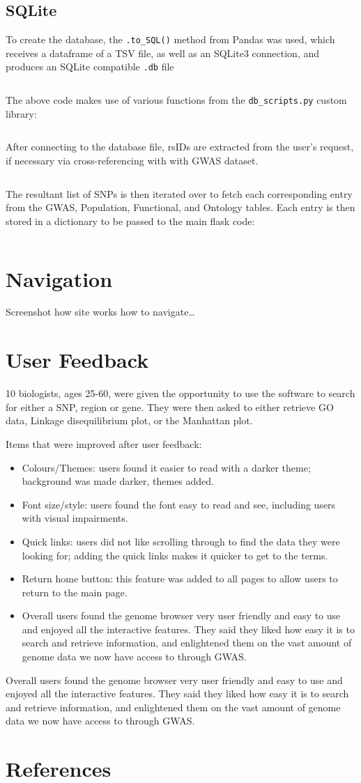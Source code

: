 \documentclass[12pt,a4paper]{article}
\newcommand{\mintfile}[1]{
\begin{tcolorbox}[colback=gray!5!white,%
	grow to left by=20mm,
    grow to right by=20mm,
    sharp corners]{{    \small \inputminted[breaklines]{python}{#1}		}}
\end{tcolorbox}}
\newcommand{\sect}[1]{
\clearpage
\hypertarget{#1}{
\section{#1}\label{#1}}
}
\newcommand{\subsect}[1]{
\FloatBarrier %
\hypertarget{#1}{
\subsection{#1}\label{#1}}
}
\begin{document}
\mintfile{code_snippets/flask/snp.py}

\subsect{SQLite}

To create the database, the \texttt{.to\_SQL()} method from Pandas was used, which receives a dataframe of a TSV file,
as well as an SQLite3 connection, and produces an SQLite compatible \texttt{.db} file

\mintfile{code_snippets/SQL/create_db.py}
The above code makes use of various functions from the \texttt{db\_scripts.py} custom library:

\mintfile{code_snippets/SQL/pdDB.py}

After connecting to the database file, rsIDs are extracted from the user's request,
if necessary via cross-referencing with with GWAS dataset.

\mintfile{code_snippets/SQL/DBreq1.py}

The resultant list of SNPs is then iterated over to fetch each corresponding entry from the
GWAS, Population, Functional, and Ontology tables.
Each entry is then stored in a dictionary to be passed to the main flask code:

\FloatBarrier

\mintfile{code_snippets/SQL/DBreq2.py}
\FloatBarrier

\sect{Navigation}
Screenshot how site works how to navigate\ldots








\sect{User Feedback}
10 biologists, ages 25-60, were given the opportunity to use the software to search for either a SNP, region or gene. They were then asked to either retrieve GO data, Linkage disequilibrium plot, or the Manhattan plot.

Items that were improved after user feedback:

\begin{itemize}
\item Colours/Themes: users found it easier to read with a darker theme; background was made darker, themes added.
\item Font size/style: users found the font easy to read and see, including users with visual impairments.
\item Quick links: users did not like scrolling through to find the data they were looking for; adding the quick links makes it quicker to get to the terms.
\item Return home button: this feature was added to all pages to allow users to return to the main page.
\item Overall users found the genome browser very user friendly and easy to use and enjoyed all the interactive features. They said they liked how easy it is to search and retrieve information, and enlightened them on the vast amount of genome data we now have access to through GWAS.
\end{itemize}

Overall users found the genome browser very user friendly and easy to use and enjoyed all the interactive features. They said they liked how easy it is to search and retrieve information, and enlightened them on the vast amount of genome data we now have access to through GWAS.

\sect{References}
\end{document}
